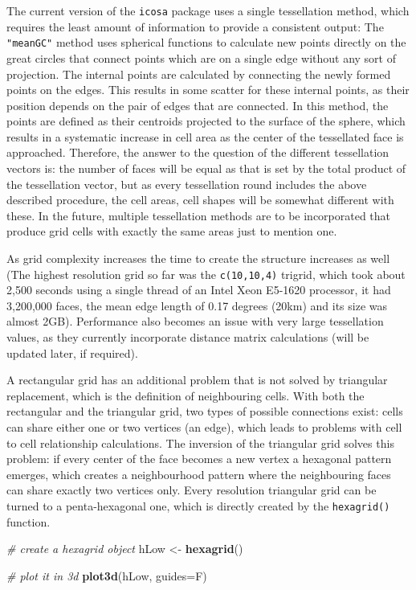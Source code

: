 \documentclass[]{article}
\newenvironment{Shaded}{\begin{snugshade}}{\end{snugshade}}
\newcommand{\KeywordTok}[1]{\textcolor[rgb]{0.13,0.29,0.53}{\textbf{#1}}}
\newcommand{\DataTypeTok}[1]{\textcolor[rgb]{0.13,0.29,0.53}{#1}}
\newcommand{\StringTok}[1]{\textcolor[rgb]{0.31,0.60,0.02}{#1}}
\newcommand{\CommentTok}[1]{\textcolor[rgb]{0.56,0.35,0.01}{\textit{#1}}}
\newcommand{\NormalTok}[1]{#1}
\begin{document}
The current version of the \texttt{icosa} package uses a single
tessellation method, which requires the least amount of information to
provide a consistent output: The \texttt{"meanGC"} method uses spherical
functions to calculate new points directly on the great circles that
connect points which are on a single edge without any sort of
projection. The internal points are calculated by connecting the newly
formed points on the edges. This results in some scatter for these
internal points, as their position depends on the pair of edges that are
connected. In this method, the points are defined as their centroids
projected to the surface of the sphere, which results in a systematic
increase in cell area as the center of the tessellated face is
approached. Therefore, the answer to the question of the different
tessellation vectors is: the number of faces will be equal as that is
set by the total product of the tessellation vector, but as every
tessellation round includes the above described procedure, the cell
areas, cell shapes will be somewhat different with these. In the future,
multiple tessellation methods are to be incorporated that produce grid
cells with exactly the same areas just to mention one.

As grid complexity increases the time to create the structure increases
as well (The highest resolution grid so far was the \texttt{c(10,10,4)}
trigrid, which took about 2,500 seconds using a single thread of an
Intel Xeon E5-1620 processor, it had 3,200,000 faces, the mean edge
length of 0.17 degrees (20km) and its size was almost 2GB). Performance
also becomes an issue with very large tessellation values, as they
currently incorporate distance matrix calculations (will be updated
later, if required).

A rectangular grid has an additional problem that is not solved by
triangular replacement, which is the definition of neighbouring cells.
With both the rectangular and the triangular grid, two types of possible
connections exist: cells can share either one or two vertices (an edge),
which leads to problems with cell to cell relationship calculations. The
inversion of the triangular grid solves this problem: if every center of
the face becomes a new vertex a hexagonal pattern emerges, which creates
a neighbourhood pattern where the neighbouring faces can share exactly
two vertices only. Every resolution triangular grid can be turned to a
penta-hexagonal one, which is directly created by the
\texttt{hexagrid()} function.

\begin{Shaded}
\begin{Highlighting}[]
\CommentTok{# create a hexagrid object}
\NormalTok{hLow <-}\StringTok{ }\KeywordTok{hexagrid}\NormalTok{()}

\CommentTok{# plot it in 3d}
\KeywordTok{plot3d}\NormalTok{(hLow, }\DataTypeTok{guides=}\NormalTok{F)}
\end{Highlighting}
\end{Shaded}
\end{document}

